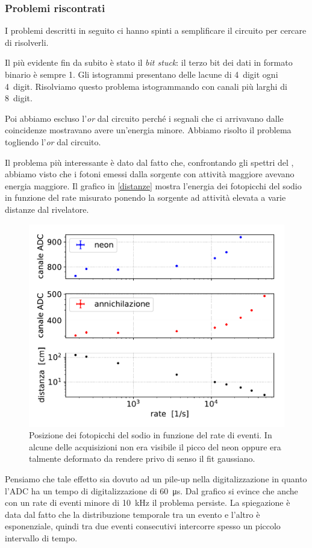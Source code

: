 \subsubsection{Problemi riscontrati}

I problemi descritti in seguito ci hanno spinti a semplificare il circuito per cercare di risolverli.

Il più evidente fin da subito è stato il \emph{bit stuck}: il terzo bit dei dati in formato binario è sempre 1. Gli istogrammi presentano delle lacune di \SI{4}{digit} ogni \SI{4}{digit}. Risolviamo questo problema istogrammando con canali più larghi di \SI{8}{digit}.

Poi abbiamo escluso l'\emph{or} dal circuito perché i segnali che ci arrivavano dalle coincidenze mostravano avere un'energia minore. Abbiamo risolto il problema togliendo l'\emph{or} dal circuito.

Il problema più interessante è dato dal fatto che, confrontando gli spettri del \na{}, abbiamo visto che i fotoni emessi dalla sorgente con attività maggiore avevano energia maggiore.
Il grafico in \autoref{distanze} mostra l'energia dei fotopicchi del sodio in funzione del rate misurato ponendo la sorgente ad attività elevata a varie distanze dal rivelatore.


\begin{figure}[h]
\centering
\includegraphics[width=25 em]{immagini/naforte}
\caption{Posizione dei fotopicchi del sodio in funzione del rate di eventi. In alcune delle acquisizioni non era visibile il picco del neon oppure era talmente deformato da rendere privo di senso il fit gaussiano.}
\label{distanze}
\end{figure}

Pensiamo che tale effetto sia dovuto ad un pile-up nella digitalizzazione in quanto l'ADC ha un tempo di digitalizzazione di \SI{60}{\micro s}. Dal grafico si evince che anche con un rate di eventi minore di \SI{10}{kHz} il problema persiste. La spiegazione è data dal fatto che la distribuzione temporale tra un evento e l'altro è esponenziale, quindi tra due eventi consecutivi intercorre spesso un piccolo intervallo di tempo. 

